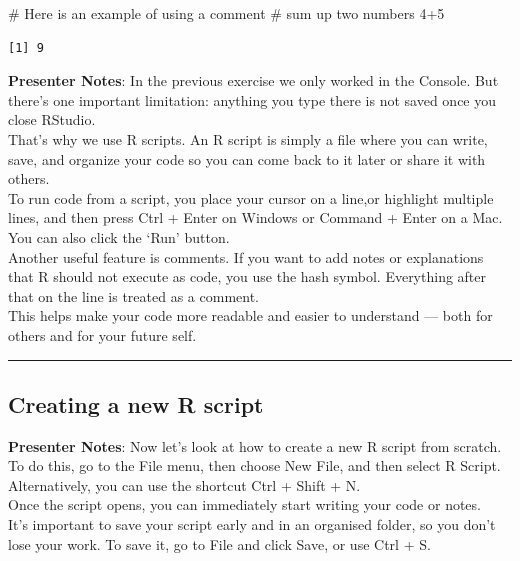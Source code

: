 \documentclass[
  letterpaper,
  DIV=11,
  numbers=noendperiod]{scrartcl}
\newenvironment{Shaded}{\begin{snugshade}}{\end{snugshade}}
\newcommand{\CommentTok}[1]{\textcolor[rgb]{0.37,0.37,0.37}{#1}}
\newcommand{\DecValTok}[1]{\textcolor[rgb]{0.68,0.00,0.00}{#1}}
\newcommand{\SpecialCharTok}[1]{\textcolor[rgb]{0.37,0.37,0.37}{#1}}
\begin{document}
\begin{Shaded}
\begin{Highlighting}[]
\CommentTok{\# Here is an example of using a comment }
\CommentTok{\# sum up two numbers }
\DecValTok{4}\SpecialCharTok{+}\DecValTok{5}
\end{Highlighting}
\end{Shaded}

\begin{verbatim}
[1] 9
\end{verbatim}

\textbf{Presenter Notes}: In the previous exercise we only worked in the
Console. But there's one important limitation: anything you type there
is not saved once you close RStudio.\\
That's why we use R scripts. An R script is simply a file where you can
write, save, and organize your code so you can come back to it later or
share it with others.\\
To run code from a script, you place your cursor on a line,or highlight
multiple lines, and then press Ctrl + Enter on Windows or Command +
Enter on a Mac. You can also click the `Run' button.\\
Another useful feature is comments. If you want to add notes or
explanations that R should not execute as code, you use the hash symbol.
Everything after that on the line is treated as a comment.\\
This helps make your code more readable and easier to understand ---
both for others and for your future self.

\begin{center}\rule{0.5\linewidth}{0.5pt}\end{center}

\subsection{Creating a new R script}\label{creating-a-new-r-script}

\textbf{Presenter Notes}: Now let's look at how to create a new R script
from scratch.\\
To do this, go to the File menu, then choose New File, and then select R
Script. Alternatively, you can use the shortcut Ctrl + Shift + N.\\
Once the script opens, you can immediately start writing your code or
notes.\\
It's important to save your script early and in an organised folder, so
you don't lose your work. To save it, go to File and click Save, or use
Ctrl + S.
\end{document}
